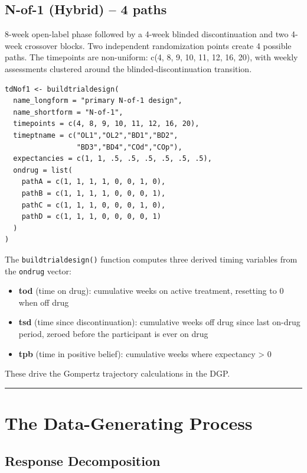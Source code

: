 \documentclass[11pt]{article}
\begin{document}
\subsection{N-of-1 (Hybrid) -- 4 paths}

8-week open-label phase followed by a 4-week blinded
discontinuation and two 4-week crossover blocks. Two independent
randomization points create 4 possible paths. The timepoints are
non-uniform: c(4, 8, 9, 10, 11, 12, 16, 20), with weekly
assessments clustered around the blinded-discontinuation
transition.

\begin{lstlisting}
tdNof1 <- buildtrialdesign(
  name_longform = "primary N-of-1 design",
  name_shortform = "N-of-1",
  timepoints = c(4, 8, 9, 10, 11, 12, 16, 20),
  timeptname = c("OL1","OL2","BD1","BD2",
                 "BD3","BD4","COd","COp"),
  expectancies = c(1, 1, .5, .5, .5, .5, .5, .5),
  ondrug = list(
    pathA = c(1, 1, 1, 1, 0, 0, 1, 0),
    pathB = c(1, 1, 1, 1, 0, 0, 0, 1),
    pathC = c(1, 1, 1, 0, 0, 0, 1, 0),
    pathD = c(1, 1, 1, 0, 0, 0, 0, 1)
  )
)
\end{lstlisting}

The \texttt{buildtrialdesign()} function computes three derived timing
variables from the \texttt{ondrug} vector:

\begin{itemize}
  \item \textbf{tod} (time on drug): cumulative weeks on active treatment,
    resetting to 0 when off drug
  \item \textbf{tsd} (time since discontinuation): cumulative weeks off drug
    since last on-drug period, zeroed before the participant is
    ever on drug
  \item \textbf{tpb} (time in positive belief): cumulative weeks where
    expectancy > 0
\end{itemize}

These drive the Gompertz trajectory calculations in the DGP.

\bigskip\noindent\rule{\textwidth}{0.4pt}\bigskip

\section{The Data-Generating Process}

\subsection{Response Decomposition}
\end{document}
